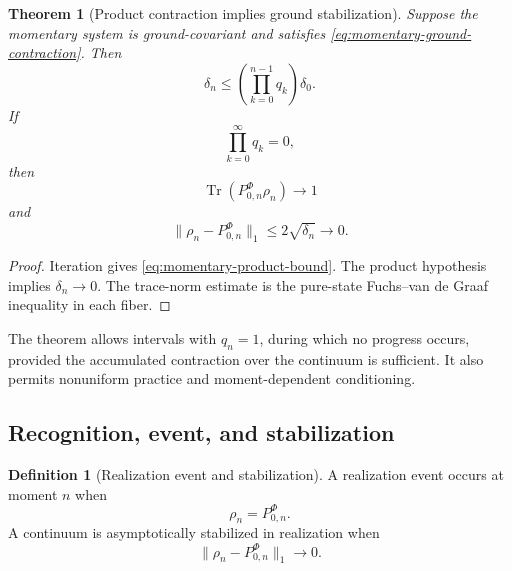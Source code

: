 \documentclass[11pt,reqno]{scrartcl}
\DeclareMathOperator{\Tr}{Tr}
\theoremstyle{plain}
\newtheorem{theorem}{Theorem}[section]
\theoremstyle{definition}
\newtheorem{definition}[definition]{Definition}
\theoremstyle{remark}
\begin{document}
\begin{theorem}[Product contraction implies ground stabilization]
\label{thm:momentary-ground-stabilization}
Suppose the momentary system is ground-covariant and satisfies
\eqref{eq:momentary-ground-contraction}.  Then
\begin{equation}
  \delta_n
  \leq
  \left(\prod_{k=0}^{n-1}q_k\right)\delta_0.
  \label{eq:momentary-product-bound}
\end{equation}
If
\begin{equation}
  \prod_{k=0}^{\infty}q_k=0,
  \label{eq:momentary-product-zero}
\end{equation}
then
\begin{equation}
  \Tr(P_{0,n}^{\Phi}\rho_n)\longrightarrow1
  \label{eq:momentary-fidelity-convergence}
\end{equation}
and
\begin{equation}
  \|\rho_n-P_{0,n}^{\Phi}\|_1
  \leq2\sqrt{\delta_n}
  \longrightarrow0.
  \label{eq:momentary-trace-convergence}
\end{equation}
\end{theorem}

\begin{proof}
Iteration gives \eqref{eq:momentary-product-bound}.  The product hypothesis
implies $\delta_n\to0$.  The trace-norm estimate is the pure-state
Fuchs--van de Graaf inequality in each fiber.
\end{proof}

The theorem allows intervals with $q_n=1$, during which no progress occurs,
provided the accumulated contraction over the continuum is sufficient.  It
also permits nonuniform practice and moment-dependent conditioning.

\subsection{Recognition, event, and stabilization}

\begin{definition}[Realization event and stabilization]
\label{def:realization-event-stabilization}
A realization event occurs at moment $n$ when
\begin{equation}
  \rho_n=P_{0,n}^{\Phi}.
\end{equation}
A continuum is asymptotically stabilized in realization when
\begin{equation}
  \|\rho_n-P_{0,n}^{\Phi}\|_1\longrightarrow0.
\end{equation}
\end{definition}
\end{document}
